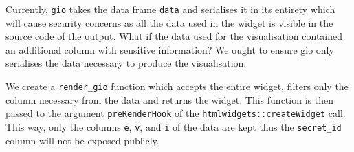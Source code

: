 \documentclass[10pt,]{krantz}
\makeatletter
\newenvironment{Shaded}{\begin{snugshade}}{\end{snugshade}}
\newcommand{\CommentTok}[1]{\textcolor[rgb]{0.37,0.37,0.37}{\textit{#1}}}
\newcommand{\ControlFlowTok}[1]{\textcolor[rgb]{0.27,0.27,0.27}{\textbf{#1}}}
\newcommand{\DataTypeTok}[1]{\textcolor[rgb]{0.27,0.27,0.27}{#1}}
\newcommand{\DecValTok}[1]{\textcolor[rgb]{0.06,0.06,0.06}{#1}}
\newcommand{\KeywordTok}[1]{\textcolor[rgb]{0.27,0.27,0.27}{\textbf{#1}}}
\newcommand{\NormalTok}[1]{#1}
\newcommand{\OperatorTok}[1]{\textcolor[rgb]{0.43,0.43,0.43}{\textbf{#1}}}
\newcommand{\OtherTok}[1]{\textcolor[rgb]{0.37,0.37,0.37}{#1}}
\newcommand{\StringTok}[1]{\textcolor[rgb]{0.5,0.5,0.5}{#1}}
\newenvironment{kframe}{%
\medskip{}
\setlength{\fboxsep}{.8em}
 \def\at@end@of@kframe{}%
 \ifinner\ifhmode%
  \def\at@end@of@kframe{\end{minipage}}%
  \begin{minipage}{\columnwidth}%
 \fi\fi%
 \def\FrameCommand##1{\hskip\@totalleftmargin \hskip-\fboxsep
 \colorbox{shadecolor}{##1}\hskip-\fboxsep
     \hskip-\linewidth \hskip-\@totalleftmargin \hskip\columnwidth}%
 \MakeFramed {\advance\hsize-\width
   \@totalleftmargin\z@ \linewidth\hsize
   \@setminipage}}%
 {\par\unskip\endMakeFramed%
 \at@end@of@kframe}
\renewenvironment{Shaded}{\begin{kframe}}{\end{kframe}}
\makeatother
\begin{document}
Currently, \texttt{gio} takes the data frame \texttt{data} and serialises it in its entirety which will cause security concerns as all the data used in the widget is visible in the source code of the output. What if the data used for the visualisation contained an additional column with sensitive information? We ought to ensure gio only serialises the data necessary to produce the visualisation.

\begin{Shaded}
\end{Shaded}

We create a \texttt{render\_gio} function which accepts the entire widget, filters only the column necessary from the data and returns the widget. This function is then passed to the argument \texttt{preRenderHook} of the \texttt{htmlwidgets::createWidget} call. This way, only the columns \texttt{e}, \texttt{v}, and \texttt{i} of the data are kept thus the \texttt{secret\_id} column will not be exposed publicly.

\begin{Shaded}
\end{Shaded}
\end{document}
